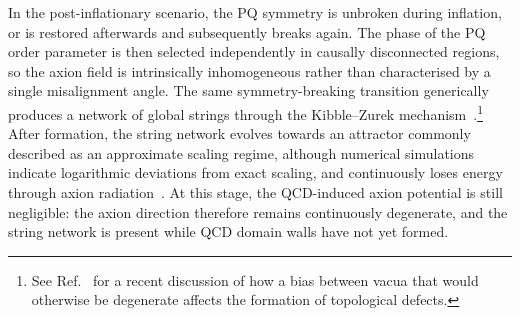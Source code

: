\documentclass[review]{elsarticle}
\numberwithin{equation}{section}
\numberwithin{table}{section}
\numberwithin{figure}{section}
\begin{document}
In the post-inflationary scenario, the PQ symmetry is unbroken during inflation, or is restored afterwards and subsequently breaks again. The phase of the PQ order parameter is then selected independently in causally disconnected regions, so the axion field is intrinsically inhomogeneous rather than characterised by a single misalignment angle. The same symmetry-breaking transition generically produces a network of global strings through the Kibble--Zurek mechanism~\cite{Kibble:1976sj,Kibble:1980mv,Zurek:1985qw}.\footnote{See Ref.~\cite{Ai:2026zpy} for a recent discussion of how a bias between vacua that would otherwise be degenerate affects the formation of topological defects.} After formation, the string network evolves towards an attractor commonly described as an approximate scaling regime, although numerical simulations indicate logarithmic deviations from exact scaling, and continuously loses energy through axion radiation~\cite{Gorghetto:2018myk,Buschmann:2019icd,Gorghetto:2020qws}. At this stage, the QCD-induced axion potential is still negligible: the axion direction therefore remains continuously degenerate, and the string network is present while QCD domain walls have not yet formed.
\end{document}
